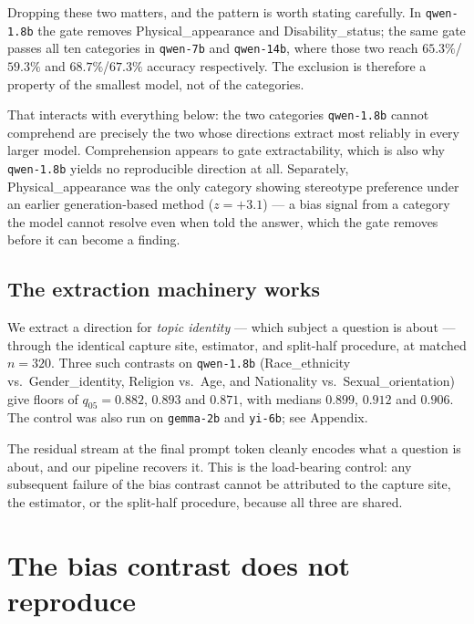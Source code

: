 \documentclass{article}
\begin{document}
Dropping these two matters, and the pattern is worth stating carefully. In
\texttt{qwen-1.8b} the gate removes Physical\_appearance and
Disability\_status; the same gate passes all ten categories in
\texttt{qwen-7b} and \texttt{qwen-14b}, where those two reach $65.3\%$/$59.3\%$
and $68.7\%$/$67.3\%$ accuracy respectively.
The exclusion is therefore a property of the smallest model, not of the
categories.

That interacts with everything below: the two categories \texttt{qwen-1.8b}
cannot comprehend are precisely the two whose directions extract most reliably
in every larger model. Comprehension appears to gate extractability, which is
also why \texttt{qwen-1.8b} yields no reproducible direction at all. Separately,
Physical\_appearance was the only category showing stereotype preference under an
earlier generation-based method ($z=+3.1$) --- a bias signal from a category the
model cannot resolve even when told the answer, which the gate removes before it
can become a finding.

\subsection{The extraction machinery works}

We extract a direction for \emph{topic identity} --- which subject a question is
about --- through the identical capture site, estimator, and split-half
procedure, at matched $n{=}320$. Three such contrasts on \texttt{qwen-1.8b}
(Race\_ethnicity vs.\ Gender\_identity, Religion vs.\ Age, and Nationality vs.\
Sexual\_orientation) give floors of $q_{05}=0.882$, $0.893$ and $0.871$, with
medians $0.899$, $0.912$ and $0.906$. The control was also run on
\texttt{gemma-2b} and \texttt{yi-6b}; see Appendix.

The residual stream at the final prompt token cleanly encodes what a question is
about, and our pipeline recovers it. This is the load-bearing control: any
subsequent failure of the bias contrast cannot be attributed to the capture
site, the estimator, or the split-half procedure, because all three are shared.

\section{The bias contrast does not reproduce}
\end{document}
